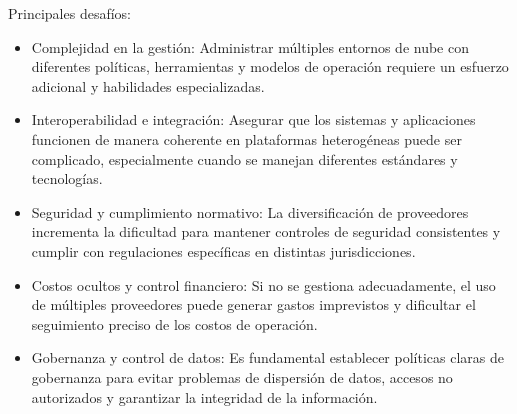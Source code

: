 {                Principales desaf{\'i}os:
                \begin{itemize}
                    \item Complejidad en la gesti{\'o}n: Administrar m{\'u}ltiples entornos de nube con diferentes pol{\'i}ticas, herramientas y modelos de operaci{\'o}n requiere un esfuerzo adicional y habilidades especializadas.
                    \item Interoperabilidad e integraci{\'o}n: Asegurar que los sistemas y aplicaciones funcionen de manera coherente en plataformas heterog{\'e}neas puede ser complicado, especialmente cuando se manejan diferentes est{\'a}ndares y tecnolog{\'i}as.
                    \item Seguridad y cumplimiento normativo: La diversificaci{\'o}n de proveedores incrementa la dificultad para mantener controles de seguridad consistentes y cumplir con regulaciones espec{\'i}ficas en distintas jurisdicciones.
                    \item Costos ocultos y control financiero: Si no se gestiona adecuadamente, el uso de m{\'u}ltiples proveedores puede generar gastos imprevistos y dificultar el seguimiento preciso de los costos de operaci{\'o}n.
                    \item Gobernanza y control de datos: Es fundamental establecer pol{\'i}ticas claras de gobernanza para evitar problemas de dispersi{\'o}n de datos, accesos no autorizados y garantizar la integridad de la informaci{\'o}n.
                \end{itemize}
}
